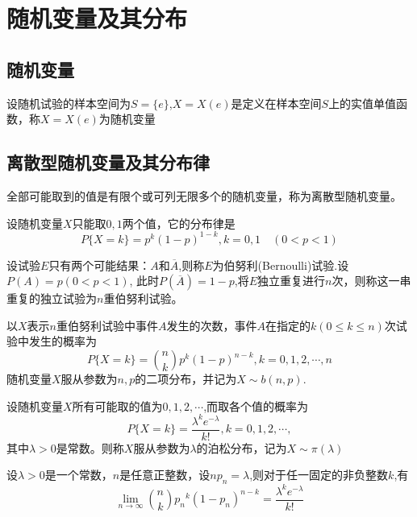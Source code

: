 \chapter{随机变量及其分布}

\section{随机变量}
\begin{definition}[随机变量]
  设随机试验的样本空间为$S=\{e\}$,$X=X(e)$是定义在样本空间$S$上的实值单值函数，称$X=X(e)$为随机变量
\end{definition}

\section{离散型随机变量及其分布律}
\begin{definition}[离散型随机变量]
    全部可能取到的值是有限个或可列无限多个的随机变量，称为离散型随机变量。
\end{definition}

\begin{definition}[($0-1$)分布]
    设随机变量$X$只能取$0,1$两个值，它的分布律是
    $$P\{X=k\}=p^k(1-p)^{1-k},k=0,1 \quad (0<p<1)$$
\end{definition}

\begin{definition}[伯努利试验]
    设试验$E$只有两个可能结果：$A$和$\overline{A} $,则称$E$为伯努利(Bernoulli)试验.设$P(A)=p(0<p<1)$,
    此时$P(\overline{A})=1-p$,将$E$独立重复进行$n$次，则称这一串重复的独立试验为$n$重伯努利试验。
\end{definition}

\begin{definition}[二项分布]
    以$X$表示$n$重伯努利试验中事件$A$发生的次数，事件$A$在指定的$k(0\leq k\leq n)$次试验中发生的概率为
    $$P\{X=k\}=\binom{n}{k}p^k(1-p)^{n-k},k=0,1,2,\cdots,n$$
    随机变量$X$服从参数为$n,p$的二项分布，并记为$X\sim b(n,p)$. 
\end{definition}

\begin{definition}[泊松分布]
    设随机变量$X$所有可能取的值为$0,1,2,\cdots$,而取各个值的概率为
    $$P\{X=k\}=\frac{\lambda^ke^{-\lambda}}{k!},k=0,1,2,\cdots,$$
    其中$\lambda>0$是常数。则称$X$服从参数为$\lambda$的泊松分布，记为$X\sim \pi(\lambda) $
\end{definition}

\begin{theorem}[泊松定理]
    设$\lambda>0$是一个常数，$n$是任意正整数，设$np_n=\lambda$,则对于任一固定的非负整数$k$,有
    $$\lim_{n \to \infty}\binom{n}{k}{p_n}^k(1-p_n)^{n-k}=\frac{\lambda^ke^{-\lambda}}{k!}$$   
\end{theorem}

